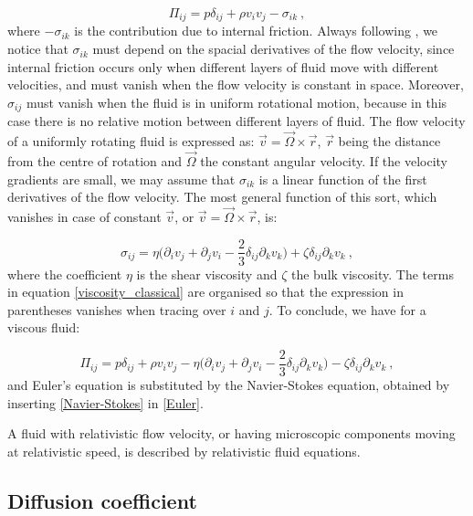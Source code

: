 \begin{equation}
\Pi_{ij} = p \delta_{ij} + \rho v_i v_j - \sigma_{ik} \: ,
\end{equation}
%
where $-\sigma_{ik}$ is the contribution due to internal friction. Always following \cite{landau2013fluid}, we notice that $\sigma_{ik}$ must depend on the spacial derivatives of the flow velocity, since internal friction occurs only when different layers of fluid move with different velocities, and must vanish when the flow velocity is constant in space. Moreover, $\sigma_{ij}$
must vanish when the fluid is in uniform rotational motion, because in this case there is no relative motion between different layers of fluid. The flow velocity of a uniformly rotating fluid is expressed as: $\vec v = \vec \Omega \times \vec r$, $\vec r$ being the distance from the centre of rotation and $\vec \Omega$ the constant angular velocity. If the velocity gradients are small, we may assume that $\sigma_{ik}$ is a linear function of the first derivatives of the flow velocity. The most general function of this sort, which vanishes in case of constant $\vec v$, or $\vec v = \vec \Omega \times \vec r$, is:

\begin{equation}
\sigma_{ij} = \eta \biggl( \partial_i v_j + \partial_j v_i -\frac{2}{3} \delta_{ij} \partial_k v_k \biggr) + \zeta \delta_{ij} \partial_{k} v_k \: ,
\label{viscosity_classical}
\end{equation}
%
where the coefficient $\eta$ is the shear viscosity and $\zeta$ the bulk viscosity. The terms in equation \ref{viscosity_classical} are organised so that the expression in parentheses vanishes when tracing over $i$ and $j$. To conclude, we have for a viscous fluid:

\begin{equation}
\Pi_{ij} = p \delta_{ij} + \rho v_i v_j - \eta \biggl( \partial_i v_j + \partial_j v_i -\frac{2}{3} \delta_{ij} \partial_k v_k \biggr) - \zeta \delta_{ij} \partial_{k} v_k \: ,
\label{Navier-Stokes}
\end{equation}
%
and Euler's equation is substituted by the Navier-Stokes equation, obtained by inserting \ref{Navier-Stokes} in \ref{Euler}.


A fluid with relativistic flow velocity, or having microscopic components moving at relativistic speed, is described by relativistic fluid equations.
 
 \subsection{Diffusion coefficient}


